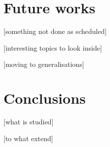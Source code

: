 \documentclass[12pt,a4paper]{report}
\begin{document}





















\chapter{Future works}

 [something not done as scheduled]

 [interesting topics to look inside]

 [moving to generalisations]









\chapter{Conclusions}

 [what is studied]

 [to what extend]
\end{document}
